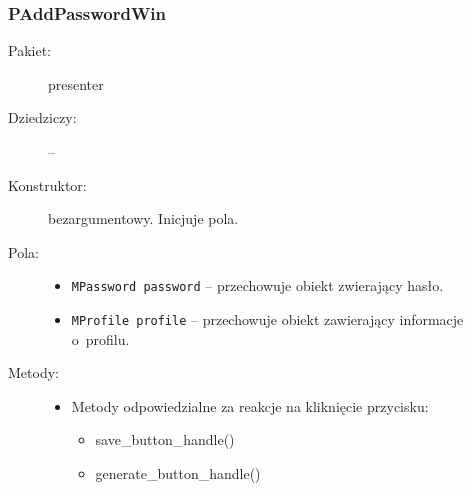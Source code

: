 \documentclass[a4paper]{article}
\newcommand{\prog}{\texttt}
\begin{document}
\subsubsection{PAddPasswordWin}
\begin{description}
    \item[Pakiet:] presenter
    \item[Dziedziczy:] --
    \item[Konstruktor:] bezargumentowy. Inicjuje pola.
    \item[Pola:] \hfill
    \begin{itemize}
        \item \prog{MPassword password} -- przechowuje obiekt zwierający hasło.
        \item \prog{MProfile profile} -- przechowuje obiekt zawierający informacje o~profilu.
    \end{itemize}
    \item[Metody:] \hfill
    \begin{itemize}
        \item Metody odpowiedzialne za reakcje na kliknięcie przycisku:
        \begin{itemize}
            \item save\_button\_handle()
            \item generate\_button\_handle()
        \end{itemize}
    \end{itemize}
\end{description}
\end{document}
